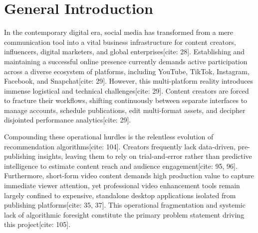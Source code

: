 \chapter*{General Introduction}
{}

\noindent In the contemporary digital era, social media has transformed from a mere communication tool into a vital business infrastructure for content creators, influencers, digital marketers, and global enterprises[cite: 28]. Establishing and maintaining a successful online presence currently demands active participation across a diverse ecosystem of platforms, including YouTube, TikTok, Instagram, Facebook, and Snapchat[cite: 29]. However, this multi-platform reality introduces immense logistical and technical challenges[cite: 29]. Content creators are forced to fracture their workflows, shifting continuously between separate interfaces to manage accounts, schedule publications, edit multi-format assets, and decipher disjointed performance analytics[cite: 29]. 

Compounding these operational hurdles is the relentless evolution of recommendation algorithms[cite: 104]. Creators frequently lack data-driven, pre-publishing insights, leaving them to rely on trial-and-error rather than predictive intelligence to estimate content reach and audience engagement[cite: 95, 96]. Furthermore, short-form video content demands high production value to capture immediate viewer attention, yet professional video enhancement tools remain largely confined to expensive, standalone desktop applications isolated from publishing platforms[cite: 35, 37]. This operational fragmentation and systemic lack of algorithmic foresight constitute the primary problem statement driving this project[cite: 105].

